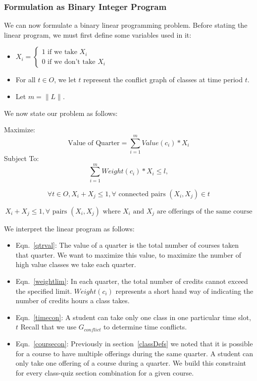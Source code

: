 \documentclass[11pt]{article} %
\begin{document}
\subsubsection{Formulation as Binary Integer Program} We can now formulate
a binary linear programming problem.  Before stating the linear
program, we must first define some variables used in it: 

\begin{itemize}
    \item $ X_i = \left\{ \begin{array}{lr} 1 \text{ if we take } X_i\\ 0 \text{ if
we don't take } X_i \end{array} \right.  $ 
    \item For all $t \in O$, we let $t$ represent the conflict graph of classes
    at time period $t$.
    \item Let $m = \|L\|$.  
\end{itemize} 
We now state our problem as follows: 

Maximize: 
\begin{equation}
    \text{Value of Quarter} = \sum_{i=1}^m Value(c_i) * X_i
    \label{qtrval}
\end{equation}
Subject To:
\begin{equation}
    \sum_{i=1}^m Weight(c_i) * X_i \leq l, 
    \label{weightlim}
\end{equation}

\begin{equation}
    \forall t \in O,X_i+X_j \leq 1, \forall \text{ connected pairs } (X_i,X_j) \in t
    \label{timecon}
\end{equation}

\begin{equation}
   X_i + X_j \leq 1, \forall \text{ pairs } (X_i,X_j) \text{ where } X_i \text{ and } X_j \text{ are offerings of
   the same course}
    \label{coursecon}
\end{equation}

We interpret the linear program as follows: \begin{itemize} \item
Eqn.~\ref{qtrval}: The value of a quarter is the total number of courses taken
that quarter.  We want to maximize this value, to maximize the number of high
value classes we take each quarter.  \item Eqn.~\ref{weightlim}: In each quarter,
the total number of credits cannot exceed the specified limit.  $Weight(c_i)$
represents a short hand way of indicating the number of credits hours a class
takes.  \item Eqn.~\ref{timecon}: A student can take only one class in one particular
time slot, $t$  Recall that we use $G_{conflict}$ to determine time conflicts.
\item Eqn.~\ref{coursecon}: Previously in
section~\ref{classDefs} we noted that it is possible for a course to have multiple
offerings during the same quarter.  A student can only take one offering
of a course during a quarter.  We build this constraint for every class-quiz section
combination for a given course.\end{itemize}
\end{document}
